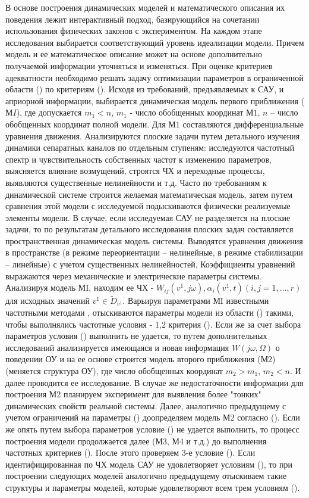 В основе построения динамических моделей и математического описания их поведения лежит интерактивный подход, базирующийся на сочетании использования физических законов с экспериментом. На каждом этапе исследования выбирается соответствующий уровень идеализации модели. Причем модель и ее математическое описание может на основе дополнительно получаемой информации уточняться и изменяться. При оценке критериев адекватности необходимо решать задачу оптимизации параметров в ограниченной области () по критериям (). 
Исходя из требований, предъявляемых к САУ, и априорной информации, выбирается динамическая модель первого приближения ($МI$), где допускается $m_1 < n$, $m_1$ - число обобщенных координат $М1$, $n$ – число обобщенных координат полной модели. Для $М1$ составляются дифференциальные уравнения движения. 
Анализируются плоские задачи путем детального изучения динамики сепаратных каналов по отдельным ступеням: исследуются частотный спектр и чувствительность собственных частот к изменению параметров, выясняется влияние возмущений, строятся ЧХ и переходные процессы, выявляются существенные нелинейности и т.д. 
Часто по требованиям к динамической системе строится желаемая математическая модель, затем путем сравнения этой модели с исследуемой подыскиваются физически реализуемые элементы модели. В случае, если исследуемая САУ не разделяется на плоские задачи, то по результатам детального исследования плоских задач составляется пространственная динамическая модель системы. Выводятся уравнения движения в пространстве (в режиме переориентации – нелинейные, в режиме стабилизации – линейные) с учетом существенных нелинейностей, Коэффициенты уравнений выражаются через механические и электрические параметры системы. 
Анализируя модель МI, находим ее 
ЧХ - $W_{ij} (v^1,j\omega),\alpha_i (v^1,t) (i,j=1,...,r)$ для исходных значений 
$v^1 \in \tilde{D}_{v^1}$. Варьируя параметрами МI известными частотными методами \cite[]{Bessekerski20}, отыскиваются параметры модели из области () такими, чтобы выполнялись частотные условия - 1,2 критерия (). Если же за счет выбора параметров условия () выполнить не удается, то путем дополнительных исследований анализируется имеющаяся и новая информация $ W(j\omega,\Omega{}) $ о поведении ОУ и на ее основе строится модель второго приближения (М2) (меняется структура ОУ), где число обобщенных координат $m_2>m_1$, $m_2<n$. И далее проводится ее исследование. 
В случае же недостаточности информации для построения М2 планируем эксперимент для выявления более "тонких" динамических свойств реальной системы. Далее, аналогично предыдущему с учетом ограничений на параметры () доопределяем модель М2 согласно (). Если же опять путем выбора параметров условие () не удается выполнить, то процесс построения модели продолжается далее (М3, М4 и т.д.) до выполнения частотных критериев (). После этого проверяем 3-е условие (). Если идентифицированная по ЧХ модель САУ не удовлетворяет условиям (), то при построении следующих моделей аналогично предыдущему отыскиваем такие структуры и параметры моделей, которые удовлетворяют всем трем условиям (). 
